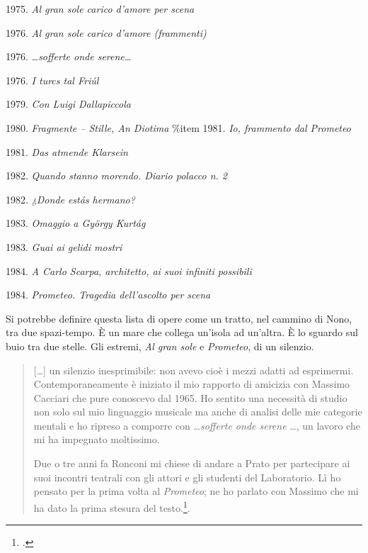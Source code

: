\begin{compactitem}
  \item 1975.	\emph{Al gran sole carico d’amore per scena}
  \item 1976.	\emph{Al gran sole carico d’amore (frammenti)}
  \item 1976.	\emph{\ldots sofferte onde serene\ldots}
  \item 1976.	\emph{I turcs tal Friúl}
  \item 1979.   \emph{Con Luigi Dallapiccola}
  \item 1980.	\emph{Fragmente – Stille, An Diotima}
  \%item 1981.	\emph{Io, frammento dal Prometeo}
  \item 1981.	\emph{Das atmende Klarsein}
  \item 1982.	\emph{Quando stanno morendo. Diario polacco n. 2}
  \item 1982.	\emph{¿Donde estás hermano?}
  \item 1983.	\emph{Omaggio a György Kurtág}
  \item 1983.	\emph{Guai ai gelidi mostri}
  \item 1984.	\emph{A Carlo Scarpa, architetto, ai suoi infiniti possibili}
  \item 1984.	\emph{Prometeo. Tragedia dell’ascolto per scena}
\end{compactitem}

Si potrebbe definire questa lista di opere come un tratto, nel cammino di Nono, tra due spazi-tempo. È un mare che collega un'isola ad un'altra. È lo sguardo sul buio tra due stelle. Gli estremi, \emph{Al gran sole} e \emph{Prometeo}, di un silenzio.

\begin{quote}
[\ldots] un silenzio inesprimibile: non avevo cioè i mezzi adatti ad esprimermi. Contemporaneamente è iniziato il mio rapporto di amicizia con Massimo Cacciari che pure conoscevo dal 1965. Ho sentito una necessità di studio non solo sul mio linguaggio musicale ma anche di analisi delle mie categorie mentali e ho ripreso a comporre con \ldots \emph{sofferte onde serene} \ldots, un lavoro che mi ha impegnato moltissimo.
	
	Due o tre anni fa Ronconi mi chiese di andare a Prato per partecipare ai suoi incontri teatrali con gli attori e gli studenti del Laboratorio. Lì ho pensato per la prima volta al \emph{Prometeo}; ne ho parlato con Massimo che mi ha dato la prima stesura del testo.\footcite[vol. II p. 245, \emph{Intervista di Renato Garavaglia 1979-80}]{nono:scrcol}.
\end{quote} 

